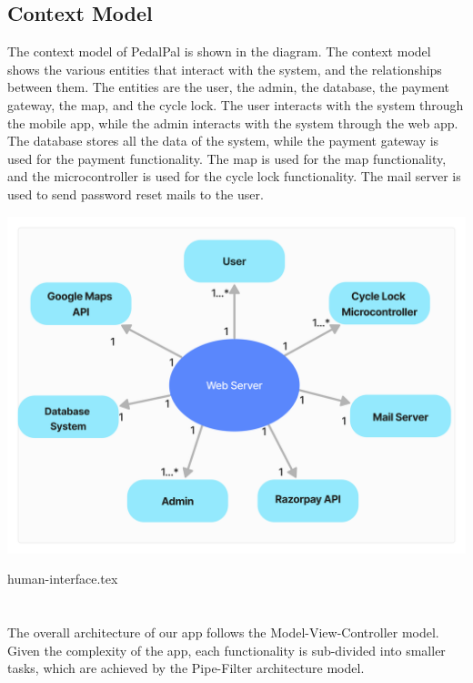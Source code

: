 \documentclass[11pt]{article}
\begin{document}
\subsection{Context Model}
The context model of PedalPal is shown in the diagram. The context model shows the various entities that interact with the system, and the relationships between them. The entities are the user, the admin, the database, the payment gateway, the map, and the cycle lock. The user interacts with the system through the mobile app, while the admin interacts with the system through the web app. The database stores all the data of the system, while the payment gateway is used for the payment functionality. The map is used for the map functionality, and the microcontroller is used for the cycle lock functionality. The mail server is used to send password reset mails to the user.
\begin{center}
  \includegraphics[scale=0.1]{state-diagram-images/context-model.jpg}
\end{center}

 {human-interface.tex}

\newpage
\section{}
The overall architecture of our app follows the Model-View-Controller model. Given the complexity of the app, each functionality is sub-divided into smaller tasks, which are achieved by the Pipe-Filter architecture model.
\end{document}

